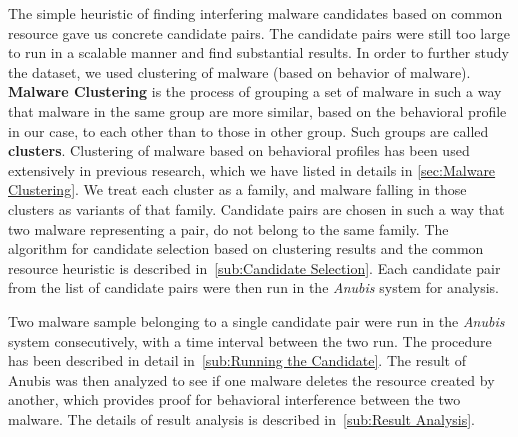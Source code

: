 The simple heuristic of finding interfering malware candidates based on common resource gave us concrete candidate pairs.  The candidate pairs were still too large to run in a scalable manner and find substantial results.
In order to further study the dataset, we used clustering of malware (based on behavior of malware).
\textbf{Malware Clustering} is the process of grouping a set of malware in such a way that malware in the same group are more similar, based on the behavioral profile in our case, to each other than to those in other group.
Such groups are called \textbf{clusters}.
Clustering of malware based on behavioral profiles has been used extensively in previous research, which we have listed in details in \autoref{sec:Malware Clustering}.
We treat each cluster as a family, and malware falling in those clusters as variants of that family.
Candidate pairs are chosen in such a way that two malware representing a pair, do not belong to the same family.
The algorithm for candidate selection based on clustering results and the common resource heuristic is described in~\autoref{sub:Candidate Selection}.
Each candidate pair from the list of candidate pairs were then run in the \emph{Anubis} system for analysis.

Two malware sample belonging to a single candidate pair were run in the \emph{Anubis} system consecutively, with a time interval between the two run.
The procedure has been described in detail in~\autoref{sub:Running the Candidate}.
The result of Anubis was then analyzed to see if one malware deletes the resource created by another, which provides proof for behavioral interference between the two malware.
The details of result analysis is described in~\autoref{sub:Result Analysis}.\\


